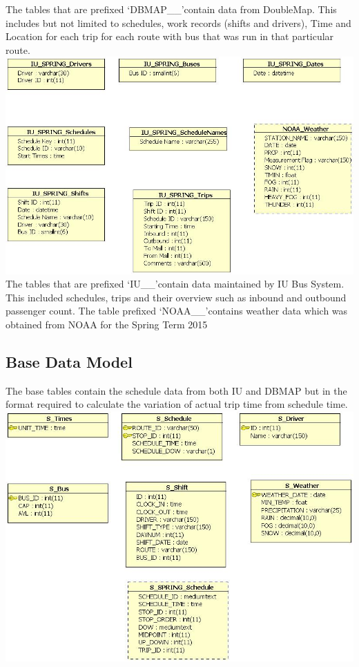 \documentclass[12pt]{article}\usepackage[]{graphicx}\usepackage[]{color}
\begin{document}
The tables that are prefixed \lq DBMAP\_\_\rq contain data from DoubleMap. This includes but not limited to schedules, work records (shifts and drivers), Time and Location for each trip for each route with bus that was run in that particular route. \\
\includegraphics[scale=0.5]{resources/IU_access}\\[1cm] 
The tables that are prefixed \lq IU\_\_\rq contain data maintained by IU Bus System. This included schedules, trips and their overview such as inbound and outbound passenger count. The table prefixed \lq NOAA\_\_\rq contains weather data which was obtained from NOAA\cite{6} for the 
Spring Term 2015\\
\subsection{Base Data Model}
The base tables contain the schedule data from both IU and DBMAP but in the format required to calculate the variation of actual trip time from schedule time. \\
\includegraphics[scale=0.5]{resources/Source_spring}\\[1cm] 
\end{document}

